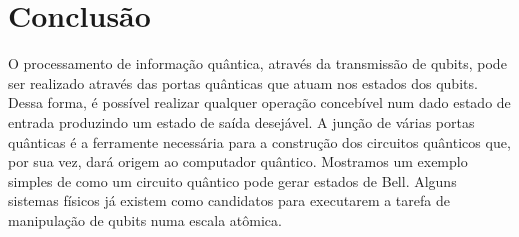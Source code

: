 \documentclass{article}
\begin{document}
\section{Conclusão}

O processamento de informação quântica, através da transmissão de qubits, pode ser realizado através das portas quânticas que atuam nos estados dos qubits. Dessa forma, é possível realizar qualquer operação concebível num dado estado de entrada produzindo um estado de saída desejável. A junção de várias portas quânticas é a ferramente necessária para a construção dos circuitos quânticos que, por sua vez, dará origem ao computador quântico. Mostramos um exemplo simples de como um circuito quântico pode gerar estados de Bell. Alguns sistemas físicos já existem como candidatos para executarem a tarefa de manipulação de qubits numa escala atômica. 
\end{document}
